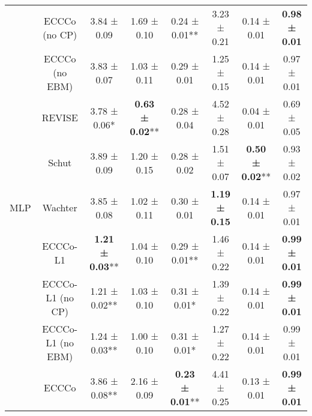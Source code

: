\begin{table}
{\begin{tabular}[t]{cccccccc}
 & ECCCo (no CP) & 3.84 ± 0.09\hphantom{*}\hphantom{*} & 1.69 ± 0.10\hphantom{*}\hphantom{*} & 0.24 ± 0.01** & 3.23 ± 0.21\hphantom{*}\hphantom{*} & 0.14 ± 0.01\hphantom{*}\hphantom{*} & \textbf{0.98 ± 0.01}\hphantom{*}\hphantom{*}\\

 & ECCCo (no EBM) & 3.83 ± 0.07\hphantom{*}\hphantom{*} & 1.03 ± 0.11\hphantom{*}\hphantom{*} & 0.29 ± 0.01\hphantom{*}\hphantom{*} & 1.25 ± 0.15\hphantom{*}\hphantom{*} & 0.14 ± 0.01\hphantom{*}\hphantom{*} & 0.97 ± 0.01\hphantom{*}\hphantom{*}\\

 & REVISE & 3.78 ± 0.06*\hphantom{*} & \textbf{0.63 ± 0.02}** & 0.28 ± 0.04\hphantom{*}\hphantom{*} & 4.52 ± 0.28\hphantom{*}\hphantom{*} & 0.04 ± 0.01\hphantom{*}\hphantom{*} & 0.69 ± 0.05\hphantom{*}\hphantom{*}\\

 & Schut & 3.89 ± 0.09\hphantom{*}\hphantom{*} & 1.20 ± 0.15\hphantom{*}\hphantom{*} & 0.28 ± 0.02\hphantom{*}\hphantom{*} & 1.51 ± 0.07\hphantom{*}\hphantom{*} & \textbf{0.50 ± 0.02}** & 0.93 ± 0.02\hphantom{*}\hphantom{*}\\

\multirow[t]{-10}{*}{\centering\arraybackslash MLP} & Wachter & 3.85 ± 0.08\hphantom{*}\hphantom{*} & 1.02 ± 0.11\hphantom{*}\hphantom{*} & 0.30 ± 0.01\hphantom{*}\hphantom{*} & \textbf{1.19 ± 0.15}\hphantom{*}\hphantom{*} & 0.14 ± 0.01\hphantom{*}\hphantom{*} & 0.97 ± 0.01\hphantom{*}\hphantom{*}\\
\cmidrule{1-8}
 & ECCCo-L1 & \textbf{1.21 ± 0.03}** & 1.04 ± 0.10\hphantom{*}\hphantom{*} & 0.29 ± 0.01** & 1.46 ± 0.22\hphantom{*}\hphantom{*} & 0.14 ± 0.01\hphantom{*}\hphantom{*} & \textbf{0.99 ± 0.01}\hphantom{*}\hphantom{*}\\

 & ECCCo-L1 (no CP) & 1.21 ± 0.02** & 1.03 ± 0.10\hphantom{*}\hphantom{*} & 0.31 ± 0.01*\hphantom{*} & 1.39 ± 0.22\hphantom{*}\hphantom{*} & 0.14 ± 0.01\hphantom{*}\hphantom{*} & \textbf{0.99 ± 0.01}\hphantom{*}\hphantom{*}\\

 & ECCCo-L1 (no EBM) & 1.24 ± 0.03** & 1.00 ± 0.10\hphantom{*}\hphantom{*} & 0.31 ± 0.01*\hphantom{*} & 1.27 ± 0.22\hphantom{*}\hphantom{*} & 0.14 ± 0.01\hphantom{*}\hphantom{*} & 0.99 ± 0.01\hphantom{*}\hphantom{*}\\

 & ECCCo & 3.86 ± 0.08** & 2.16 ± 0.09\hphantom{*}\hphantom{*} & \textbf{0.23 ± 0.01}** & 4.41 ± 0.25\hphantom{*}\hphantom{*} & 0.13 ± 0.01\hphantom{*}\hphantom{*} & \textbf{0.99 ± 0.01}\hphantom{*}\hphantom{*}\\


\end{tabular}}
\end{table}
